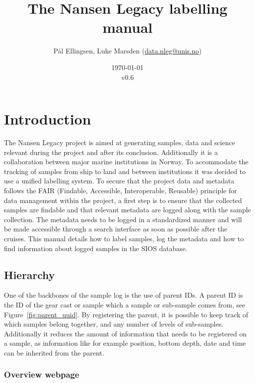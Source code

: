 \documentclass[a4paper,english, 11pt]{article}
\title{The Nansen Legacy labelling manual}
\date{\today\\v0.6}
\author{Pål Ellingsen, Luke Marsden (\url{data.nleg@unis.no})}
\begin{document}
\maketitle
\tableofcontents
\pagestyle{fancy}
\newpage
\section{Introduction} %
\label{sec:Introduction}

The Nansen Legacy project is aimed at generating samples, data and science relevant during the project and after its conclusion. Additionally it is a collaboration between major marine institutions in Norway. To accommodate the tracking of samples from ship to land and between institutions it was decided to use a unified labelling system. To secure that the project data and metadata follows the FAIR (Findable, Accessible, Interoperable, Reusable) principle for data management within the project, a first step is to ensure that the collected samples are findable and that relevant metadata are logged
along with the sample collection. The metadata needs to be logged in a standardized manner and will be
made accessible through a search interface as soon as possible after the cruises.  This manual details how to label samples, log the metadata and how to find information about logged samples in the SIOS database.  



\subsection{Hierarchy} %
\label{sub:Hirarcy}

One of the backbones of the sample log is the use of parent IDs. A parent ID is the ID of the gear cast or sample which a sample or sub-sample comes from, see Figure~\ref{fig:parent_uuid}. By registering the parent, it is possible to keep track of which samples belong together, and any number of levels of sub-samples. Additionally it reduces the amount of information that needs to be registered on a sample, as information like for example position, bottom depth, date and time can be inherited from the parent. 

\subsubsection{Overview webpage} %
\label{ssub:Overview_webpage}
\end{document}
